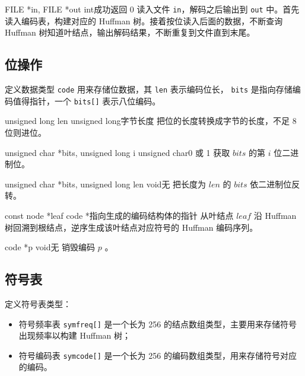 
{FILE *in, FILE *out}
{int}{成功返回 0}
{读入文件 {\tt in}，解码之后输出到 {\tt out} 中。首先读入编码表，构建对应的 Huffman 树。接着按位读入后面的数据，不断查询 Huffman 树知道叶结点，输出解码结果，不断重复到文件直到末尾。}

\subsection{位操作}

\begin{center}
\end{center}

定义数据类型 \verb|code| 用来存储位数据，其 \verb|len| 表示编码位长， \verb|bits| 是指向存储编码值得指针，一个 \verb|bits[]| 表示八位编码。

{unsigned long len}
{unsigned long}{字节长度}
{把位的长度转换成字节的长度，不足 8 位则进位。}

{unsigned char *bits, unsigned long i}
{unsigned char}{0 或 1}
{获取 $bits$ 的第 $i$ 位二进制位。}

{unsigned char *bits, unsigned long len}
{void}{无}
{把长度为 $len$ 的 $bits$ 依二进制位反转。}

{const node *leaf}
{code *}{指向生成的编码结构体的指针}
{从叶结点 $leaf$ 沿 Huffman 树回溯到根结点，逆序生成该叶结点对应符号的 Huffman 编码序列。}

{code *p}
{void}{无}
{销毁编码 $p$ 。}

\subsection{符号表}

定义符号表类型：
\begin{itemize}[topsep=0pt,partopsep=0pt,itemsep=0pt,parsep=0pt]
\item 符号频率表 \verb|symfreq[]| 是一个长为 256 的结点数组类型，主要用来存储符号出现频率以构建 Huffman 树；
\item 符号编码表 \verb|symcode[]| 是一个长为 256 的编码数组类型，用来存储符号对应的编码。
\end{itemize}

